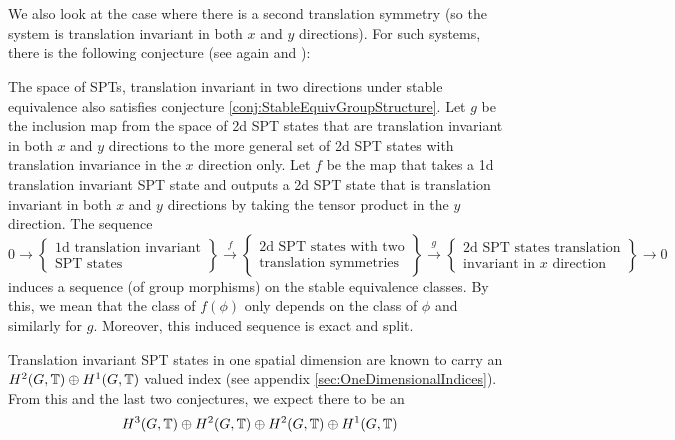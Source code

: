 \documentclass[11pt,a4paper,twoside]{article}
\numberwithin{equation}{section}
\begin{document}
	\\\\
	We also look at the case where there is a second translation symmetry (so the system is translation invariant in both $x$ and $y$ directions). For such systems, there is the following conjecture (see again \cite{xiong2019classification} and \cite{Chen_2013}):
	\begin{conjecture}\label{conj2}
		The space of SPTs, translation invariant in two directions under stable equivalence also satisfies conjecture \ref{conj:StableEquivGroupStructure}. Let $g$ be the inclusion map from the space of 2d SPT states that are translation invariant in both $x$ and $y$ directions to the more general set of 2d SPT states with translation invariance in the $x$ direction only. Let $f$ be the map that takes a 1d translation invariant SPT state and outputs a 2d SPT state that is translation invariant in both $x$ and $y$ directions by taking the tensor product in the $y$ direction. The sequence
		\begin{equation}
			0\rightarrow\left\{\begin{matrix}\text{1d translation invariant}\\ \text{SPT states}\end{matrix}\right\}\stackrel{f}{\rightarrow}\left\{\begin{matrix}\text{2d SPT states with two}\\ \text{translation symmetries}\end{matrix}\right\}\stackrel{g}{\rightarrow}\left\{\begin{matrix}\text{2d SPT states translation}\\ \text{invariant in $x$ direction}\end{matrix}\right\}\rightarrow 0
		\end{equation}
		induces a sequence (of group morphisms) on the stable equivalence classes. By this, we mean that the class of $f(\phi)$ only depends on the class of $\phi$ and similarly for $g$. Moreover, this induced sequence is exact and split.
	\end{conjecture}
	Translation invariant SPT states in one spatial dimension are known to carry an $H^2(G,\mathbb T)\oplus H^1(G,\mathbb T)$ valued index (see appendix \ref{sec:OneDimensionalIndices}). From this and the last two conjectures, we expect there to be an
	\begin{equation}\label{eq:2TranslationsIntroduction}
		H^3(G,\mathbb T)\oplus H^2(G,\mathbb T)\oplus H^2(G,\mathbb T)\oplus H^1(G,\mathbb T)
	\end{equation}
\end{document}
